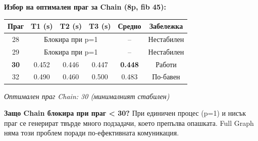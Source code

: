 \documentclass[12pt,a4paper]{article}
\begin{document}
\vspace{0.5cm}
\textbf{Избор на оптимален праг за Chain (8p, fib 45):}

\begin{center}
\begin{tabular}{|c|c|c|c|c|c|}
\hline
\textbf{Праг} & \textbf{T1 (s)} & \textbf{T2 (s)} & \textbf{T3 (s)} & \textbf{Средно} & \textbf{Забележка} \\
\hline
28 & \multicolumn{3}{c|}{Блокира при p=1} & -- & Нестабилен \\
\hline
29 & \multicolumn{3}{c|}{Блокира при p=1} & -- & Нестабилен \\
\hline
\textbf{30} & 0.452 & 0.446 & 0.447 & \textbf{0.448} & Работи \\
\hline
32 & 0.490 & 0.460 & 0.500 & 0.483 & По-бавен \\
\hline
\end{tabular}
\end{center}

\textit{Оптимален праг Chain: 30 (минималният стабилен)}

\vspace{0.3cm}
\textbf{Защо Chain блокира при праг < 30?} При единичен процес (p=1) и нисък праг се генерират твърде много подзадачи, което препълва опашката. Full Graph няма този проблем поради по-ефективната комуникация.
\end{document}
